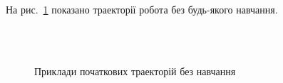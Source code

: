 \documentclass[a4paper,10pt,fleqn]{article}
\begin{document}
На рис.~\ref{fig:bad-moves-samples} показано траекторії робота без будь-якого навчання.
\begin{figure}
  \centering
  \,
   \\
  \,
  \caption{Приклади початкових траекторій без навчання}
  \label{fig:bad-moves-samples}
\end{figure}
\end{document}
